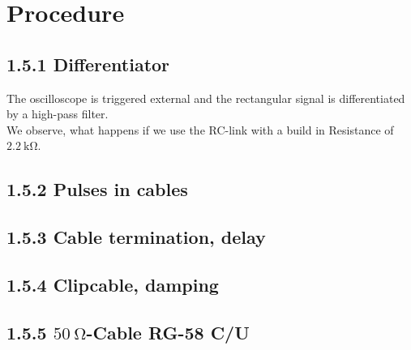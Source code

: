 \section{Procedure}
\subsection{1.5.1 Differentiator}
The oscilloscope is triggered external and the rectangular signal is differentiated by a high-pass filter.\\
We observe, what happens if we use the RC-link with a build in Resistance of $\SI{2.2}{\kilo\ohm}$.
\subsection{1.5.2 Pulses in cables}
\subsection{1.5.3 Cable termination, delay}
\subsection{1.5.4 Clipcable, damping}
\subsection{1.5.5 $\SI{50}{\ohm}$-Cable RG-58 C/U}